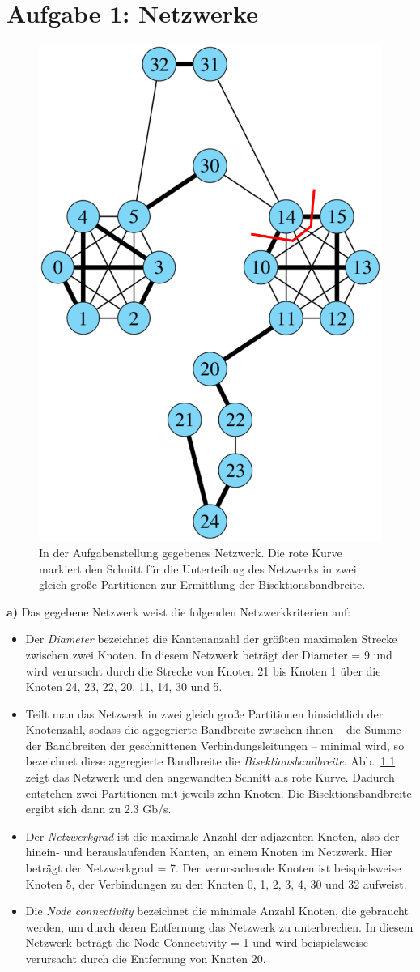 \chapter{Aufgabe 1: Netzwerke}

\begin{figure}[tb]
 \centering 
 \includegraphics[width=.5\textwidth]{gegebenesNetzwerk_geschnitten.eps}
 \caption{In der Aufgabenstellung gegebenes Netzwerk. Die rote Kurve markiert den Schnitt für die Unterteilung des Netzwerks in zwei gleich große Partitionen zur Ermittlung der Bisektionsbandbreite.}
 \label{fig:netzwerk_geschnitten}
\end{figure}


\textbf{a)} Das gegebene Netzwerk weist die folgenden Netzwerkkriterien auf:
\begin{itemize}
 \item Der \emph{Diameter} bezeichnet die Kantenanzahl der größten maximalen Strecke zwischen zwei Knoten. In diesem Netzwerk beträgt der Diameter = 9 und wird verursacht durch die Strecke von Knoten 21 bis Knoten 1 über die Knoten 24, 23, 22, 20, 11, 14, 30 und 5. 
 \item Teilt man das Netzwerk in zwei gleich große Partitionen hinsichtlich der Knotenzahl, sodass die aggegrierte Bandbreite zwischen ihnen -- die Summe der Bandbreiten der geschnittenen Verbindungsleitungen -- minimal wird, so bezeichnet diese aggregierte Bandbreite die \emph{Bisektionsbandbreite}. Abb.~\ref{fig:netzwerk_geschnitten} zeigt das Netzwerk und den angewandten Schnitt als rote Kurve. Dadurch entstehen zwei Partitionen mit jeweils zehn Knoten. Die Bisektionsbandbreite ergibt sich dann zu 2.3 Gb/s.
 \item Der \emph{Netzwerkgrad} ist die maximale Anzahl der adjazenten Knoten, also der hinein- und herauslaufenden Kanten, an einem Knoten im Netzwerk. Hier beträgt der Netzwerkgrad = 7. Der verursachende Knoten ist beispielsweise Knoten 5, der Verbindungen zu den Knoten 0, 1, 2, 3, 4, 30 und 32 aufweist.
 \item Die \emph{Node connectivity} bezeichnet die minimale Anzahl Knoten, die gebraucht werden, um durch deren Entfernung das Netzwerk zu unterbrechen. In diesem Netzwerk beträgt die Node Connectivity = 1 und wird beispielsweise verursacht durch die Entfernung von Knoten 20. 
\end{itemize}

